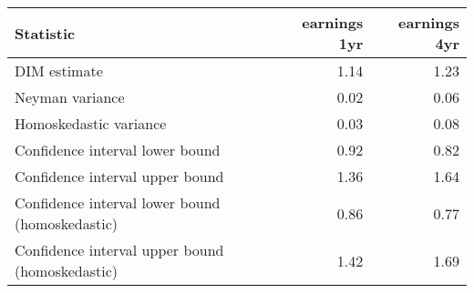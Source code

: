 \begin{tabular}{lrr}
  \hline
Statistic & earnings 1yr & earnings 4yr \\ 
  \hline
DIM estimate & 1.14 & 1.23 \\ 
  Neyman variance & 0.02 & 0.06 \\ 
  Homoskedastic variance & 0.03 & 0.08 \\ 
  Confidence interval lower bound & 0.92 & 0.82 \\ 
  Confidence interval upper bound & 1.36 & 1.64 \\ 
  Confidence interval lower bound (homoskedastic) & 0.86 & 0.77 \\ 
  Confidence interval upper bound (homoskedastic) & 1.42 & 1.69 \\ 
   \hline
\end{tabular}
